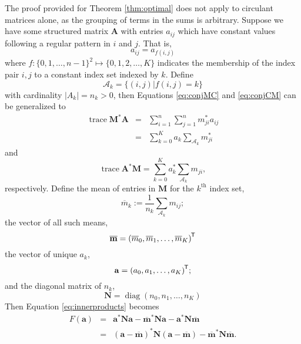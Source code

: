 \documentclass[letterpaper,12pt,oneside,final]{article}
\newcommand{\ve}[1]{\mathbf{#1}}           %
\newcommand{\m}[1]{\mathbf{#1}}               %
\newcommand{\tr}[1]{{#1}^{\mkern-1.5mu\mathsf{T}}}              %
\newcommand{\conj}[1]{{#1}^{\ast}}
\newcommand*{\trace}{\operatorname{trace}}
\newcommand*{\diag}{\operatorname{diag}}
\newcommand{\widebar}[1]{\overline{#1}}
\begin{document}
The proof provided for Theorem \ref{thm:optimal} does not apply to circulant matrices alone, as the grouping of terms in the sums is arbitrary. Suppose we have some structured matrix $\m{A}$ with entries $a_{ij}$ which have constant values following a regular pattern in $i$ and $j$. That is,
\begin{equation} \label{eq:generalStruc}
  a_{ij} = a_{f(i,j)}
\end{equation}
where $f:\{0,1, \dots, n-1\}^2 \mapsto \{0, 1, 2, \dots, K\}$ indicates the membership of the index pair $i,j$ to a constant index set indexed by $k$. Define
$$\mathcal{A}_k = \{(i,j) | f(i,j) = k\}$$
with cardinality $\lvert A_k \rvert = n_k > 0$,
then Equations \ref{eq:conjMC} and \ref{eq:conjCM} can be generalized to
\begin{eqnarray}
  \trace \conj{\m{M}} \m{A} & = & \sum_{i = 1}^n \sum_{j = 1}^n \conj{m}_{ji} a_{ij} \nonumber \\
                            & = & \sum_{k = 0}^K a_k \sum_{\mathcal{A}_k} \conj{m}_{ji} \label{eq:conjMA}
\end{eqnarray}
and
\begin{equation} \label{eq:conjAM}
  \trace \conj{\m{A}} \m{M} = \sum_{k = 0}^K \conj{a}_k \sum_{\mathcal{A}_k} m_{ji},
\end{equation}
respectively. Define the mean of entries in $\m{M}$ for the $k^{\text{th}}$ index set,
\begin{equation} \label{eq:ADiagonalSums}
  \widebar{m}_k := \frac{1}{n_k} \sum_{\mathcal{A}_k} m_{ij};
\end{equation}
the vector of all such means,
\begin{equation} \label{eq:ASumVec}
  \widebar{ \ve{m} } = \tr{ (\widebar{m}_0, \widebar{m}_1, \dots, \widebar{m}_K) }
\end{equation}
the vector of unique $a_k$,
\begin{equation} \label{eq:Svec}
 \ve{a} = \tr{ ( a_0, a_1, \dots, a_K ) };
\end{equation}
and the diagonal matrix of $n_k$,
\begin{equation} \label{eq:diagnk}
 \m{N} = \diag (n_0, n_1, \dots, n_K)
\end{equation}
Then Equation \ref{eq:innerproducts} becomes
\begin{eqnarray}
  F(\ve{a}) & = & \conj{ \ve{a} } \m{N} \ve{a} - \conj{ \widebar { \ve{m} } } \m{N} \ve{a} - \conj{ \ve{a} } \m{N} \widebar{ \ve{m} } \\
  & = & \conj{ \left ( \ve{a} - \widebar{ \ve{m} } \right ) } \m{N}  \left ( \ve{a} - \widebar{ \ve{m} } \right ) - \conj{ \widebar{ \ve{m} } } \m{N} \widebar{ \ve{m} }.
\end{eqnarray}
\end{document}
